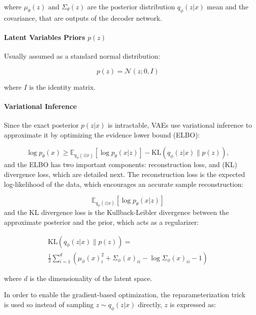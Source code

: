 \documentclass{ieeeaccess}
\begin{document}
where $\mu_\theta(z)$ and $\Sigma_\theta(z)$ are the posterior distribution $q_\phi(z | x)$ mean and the covariance, that are outputs of the decoder network.

\paragraph{Latent Variables Priors $p(z)$}
Usually assumed as a standard normal distribution:

\begin{equation}
p(z) = \mathcal{N}(z; 0, I)
\end{equation}

where $I$ is the identity matrix.

\paragraph{Variational Inference} Since the exact posterior $p(z | x)$ is intractable, VAEs use variational inference to approximate it by optimizing the evidence lower bound (ELBO):

\begin{equation}
\log p_\theta(x) \geq \mathbb{E}_{q_\phi(z | x)} \left[ \log p_\theta(x | z) \right] - \text{KL}(q_\phi(z | x) \parallel p(z)),
\end{equation}
and the ELBO has two important components: reconstruction loss, and (KL) divergence loss, which are detailed next. The reconstruction loss is the expected log-likelihood of the data, which encourages an accurate sample reconstruction:

\begin{equation}
\mathbb{E}_{q_\phi(z | x)} \left[ \log p_\theta(x | z) \right]
\end{equation}
and the KL divergence loss is the Kullback-Leibler divergence between the approximate posterior and the prior, which acts as a regularizer:

\begin{equation}
\begin{aligned}
\text{KL}(q_\phi(z | x) \parallel p(z)) 
=  \\
\frac{1}{2} \sum_{i=1}^{d} \left( \mu_\phi(x)_i^2 + \Sigma_\phi(x)_{ii} - \log \Sigma_\phi(x)_{ii} - 1 \right)
\end{aligned}
\end{equation}

where $d$ is the dimensionality of the latent space.

In order to enable the gradient-based optimization, the reparameterization trick is used so instead of sampling $z \sim q_\phi(z | x)$ directly, $z$ is expressed as:
\end{document}
